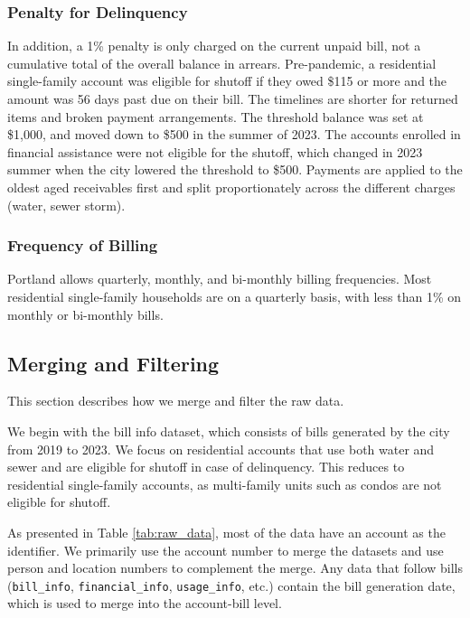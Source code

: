 \documentclass[11pt]{article}
\begin{document}
\subsubsection*{Penalty for Delinquency}

In addition, a 1\% penalty is only charged on the current unpaid bill, not a cumulative total of the overall balance in arrears. Pre-pandemic, a residential single-family account was eligible for shutoff if they owed \$115 or more and the amount was 56 days past due on their bill. The timelines are shorter for returned items and broken payment arrangements. The threshold balance was set at \$1,000, and moved down to \$500 in the summer of 2023. The accounts enrolled in financial assistance were not eligible for the shutoff, which changed in 2023 summer when the city lowered the threshold to \$500. Payments are applied to the oldest aged receivables first and split proportionately across the different charges (water, sewer storm).

\subsubsection*{Frequency of Billing}

Portland allows quarterly, monthly, and bi-monthly billing frequencies. Most residential single-family households are on a quarterly basis, with less than 1\% on monthly or bi-monthly bills.

\subsection*{Merging and Filtering}

This section describes how we merge and filter the raw data.

We begin with the bill info dataset, which consists of bills generated by the city from 2019 to 2023. We focus on residential accounts that use both water and sewer and are eligible for shutoff in case of delinquency. This reduces to residential single-family accounts, as multi-family units such as condos are not eligible for shutoff.

As presented in Table \ref{tab:raw_data}, most of the data have an account as the identifier. We primarily use the account number to merge the datasets and use person and location numbers to complement the merge. Any data that follow bills (\texttt{bill\_info}, \texttt{financial\_info}, \texttt{usage\_info}, etc.) contain the bill generation date, which is used to merge into the account-bill level.
\end{document}
